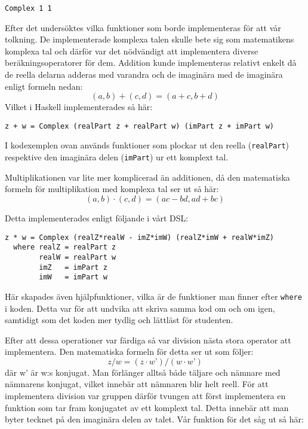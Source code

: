 \documentclass[]{article}
\begin{document}
\begin{verbatim}
Complex 1 1
\end{verbatim}

Efter det undersöktes vilka funktioner som borde implementeras för att vår tolkning. De implementerade komplexa
talen skulle bete sig som matematikens komplexa tal och därför var det nödvändigt att implementera diverse
beräkningsoperatorer för dem. Addition kunde implementeras relativt enkelt då de reella delarna adderas med
varandra och de imaginära med de imaginära enligt formeln nedan:
\[(a, b) + (c, d) = (a + c, b + d)\] \cite{conway1978functions}
Vilket i Haskell implementerades så här:
\begin{verbatim}
z + w = Complex (realPart z + realPart w) (imPart z + imPart w)
\end{verbatim}

I kodexemplen ovan används funktioner som plockar ut den reella
(\texttt{realPart}) respektive den imaginära delen
(\texttt{imPart}) ur ett komplext tal.




Multiplikationen var lite mer komplicerad än additionen, då den matematiska formeln för multiplikation med komplexa
tal ser ut så här:
 \[(a, b) \cdot (c, d) = (ac - bd, ad + bc) \] \cite{conway1978functions}

Detta implementerades enligt följande i vårt DSL:
\begin{verbatim}
z * w = Complex (realZ*realW - imZ*imW) (realZ*imW + realW*imZ)
  where realZ = realPart z
        realW = realPart w
        imZ   = imPart z
        imW   = imPart w
\end{verbatim}

Här skapades även hjälpfunktioner, vilka är de funktioner man finner efter \texttt{where}
i koden. Detta var för att undvika att skriva samma kod om och om igen, samtidigt som det koden mer tydlig och
lättläst för studenten.


Efter att dessa operationer var färdiga så var division nästa stora operator att implementera. Den matematiska formeln
för detta ser ut som följer:
\[ z / w = (z \cdot w’) / (w \cdot w’) \]
där w’ är w:s konjugat.
Man förlänger alltså både täljare och nämnare med nämnarens konjugat, vilket innebär att nämnaren
blir helt reell. För att implementera division var gruppen därför tvungen att först implementera en
funktion som tar fram konjugatet av ett komplext tal. Detta innebär att man byter tecknet på den imaginära
delen av talet. Vår funktion för det såg ut så här:
\end{document}
